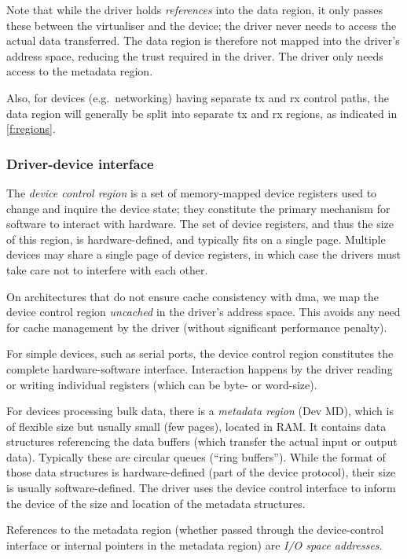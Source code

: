 \documentclass[a4paper,12pt]{report}
\begin{document}
Note that while the driver holds \emph{references} into the data region, it
only passes these between the virtualiser and the device; the driver never needs to
access the actual data transferred. The data region is therefore not
mapped into the driver's address space, reducing the trust required in
the driver. The driver only needs access to the metadata region.

Also, for devices (e.g.\ networking) having separate \gls{tx} and \gls{rx} control paths, the data
region will generally be split into separate \gls{tx} and \gls{rx} regions, as
indicated in \autoref{f:regions}.

\subsubsection{Driver-device interface}

The \emph{device control region} is a set of memory-mapped device
registers used to change and inquire the device state; they constitute
the primary mechanism for software to interact with hardware. The set
of device registers, and thus the size of this region, is
hardware-defined, and typically fits on a single page. Multiple
devices may share a single page of device registers, in which case the
drivers must take care not to interfere with each other.

On architectures that do not ensure cache consistency with \gls{dma},
we map the device control region \emph{uncached}
in the driver's address space. This avoids any need for cache management
by the driver (without significant performance penalty).

For simple devices, such as serial ports, the device control region constitutes
the complete hardware-software interface. Interaction happens by the
driver reading or writing individual registers (which can be byte- or
word-size).

For devices processing bulk data, there is a \emph{metadata region}
(Dev MD), which is of flexible size but usually small (few pages), located in
RAM. It contains data structures referencing the data buffers (which
transfer the actual input or output data). Typically these are
circular queues (``ring buffers''). While the format of those data
structures is hardware-defined (part of the device protocol), their size
is usually software-defined. The driver uses the device control interface to
inform the device of the size and location of the metadata
structures.

References to the metadata region (whether passed through the
device-control interface or internal pointers in the metadata region)
are \emph{I/O space addresses}.
\end{document}
